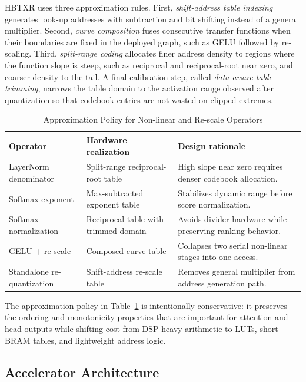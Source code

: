 \documentclass[journal]{IEEEtran}
\begin{document}
HBTXR uses three approximation rules. First, \emph{shift-address table indexing} generates look-up addresses with subtraction and bit shifting instead of a general multiplier. Second, \emph{curve composition} fuses consecutive transfer functions when their boundaries are fixed in the deployed graph, such as GELU followed by re-scaling. Third, \emph{split-range coding} allocates finer address density to regions where the function slope is steep, such as reciprocal and reciprocal-root near zero, and coarser density to the tail. A final calibration step, called \emph{data-aware table trimming}, narrows the table domain to the activation range observed after quantization so that codebook entries are not wasted on clipped extremes.

\begin{table}[t]
\caption{Approximation Policy for Non-linear and Re-scale Operators}
\label{tab:approx}
\centering
\scriptsize
\begin{tabular}{p{}p{}p{}}
\toprule
Operator & Hardware realization & Design rationale \\
\midrule
LayerNorm denominator & Split-range reciprocal-root table & High slope near zero requires denser codebook allocation. \\
Softmax exponent & Max-subtracted exponent table & Stabilizes dynamic range before score normalization. \\
Softmax normalization & Reciprocal table with trimmed domain & Avoids divider hardware while preserving ranking behavior. \\
GELU + re-scale & Composed curve table & Collapses two serial non-linear stages into one access. \\
Standalone re-quantization & Shift-address re-scale table & Removes general multiplier from address generation path. \\
\bottomrule
\end{tabular}
\end{table}

The approximation policy in Table~\ref{tab:approx} is intentionally conservative: it preserves the ordering and monotonicity properties that are important for attention and head outputs while shifting cost from DSP-heavy arithmetic to LUTs, short BRAM tables, and lightweight address logic.

\subsection{Accelerator Architecture}
\end{document}

